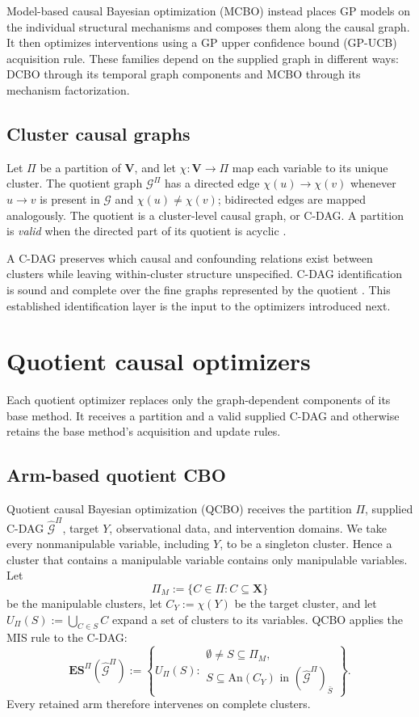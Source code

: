 \documentclass[twoside]{article}
\newcommand{\An}{\mathrm{An}}
\newcommand{\QCBO}{\textsc{QCBO}}
\newcommand{\Gg}{\mathcal{G}}
\newcommand{\ESpi}{\mathbf{ES}^{\Pi}}
\begin{document}
Model-based causal Bayesian optimization (MCBO) \citep{sussexMODELBASEDCAUSALBAYESIAN2023} instead places GP models on the individual structural mechanisms and composes them along the causal graph. It then optimizes interventions using a GP upper confidence bound (GP-UCB) acquisition rule. These families depend on the supplied graph in different ways: DCBO through its temporal graph components and MCBO through its mechanism factorization.

\subsection{Cluster causal graphs}

Let \(\Pi\) be a partition of \(\mathbf V\), and let \(\chi:\mathbf V\to\Pi\) map each variable to its unique cluster. The quotient graph \(\Gg^\Pi\) has a directed edge \(\chi(u)\to\chi(v)\) whenever \(u\to v\) is present in \(\Gg\) and \(\chi(u)\ne\chi(v)\); bidirected edges are mapped analogously. The quotient is a cluster-level causal graph, or C-DAG. A partition is \emph{valid} when the directed part of its quotient is acyclic \citep{madaleno2026a}.

A C-DAG preserves which causal and confounding relations exist between clusters while leaving within-cluster structure unspecified. C-DAG identification is sound and complete over the fine graphs represented by the quotient \citep{CausalEffectIdentification}. This established identification layer is the input to the optimizers introduced next.

\section{Quotient causal optimizers}
\label{sec:methods}

Each quotient optimizer replaces only the graph-dependent components of its base method. It receives a partition and a valid supplied C-DAG and otherwise retains the base method's acquisition and update rules.

\subsection{Arm-based quotient CBO}

Quotient causal Bayesian optimization (\QCBO{}) receives the partition \(\Pi\), supplied C-DAG \(\widehat{\Gg}^{\Pi}\), target \(Y\), observational data, and intervention domains. We take every nonmanipulable variable, including \(Y\), to be a singleton cluster. Hence a cluster that contains a manipulable variable contains only manipulable variables. Let
\[
 \Pi_M:=\{C\in\Pi:C\subseteq\mathbf X\}
\]
be the manipulable clusters, let \(C_Y:=\chi(Y)\) be the target cluster, and let \(U_\Pi(S):=\bigcup_{C\in S}C\) expand a set of clusters to its variables. QCBO applies the MIS rule to the C-DAG:
\begin{equation}
 \ESpi(\widehat{\Gg}^{\Pi})
 :=\left\{U_\Pi(S):
 \substack{\emptyset\ne S\subseteq\Pi_M,\\
 S\subseteq\An(C_Y)\text{ in }
 (\widehat{\Gg}^{\Pi})_{\bar S}}\right\}.
 \label{eq:qcbo-arms}
\end{equation}
Every retained arm therefore intervenes on complete clusters.
\end{document}
